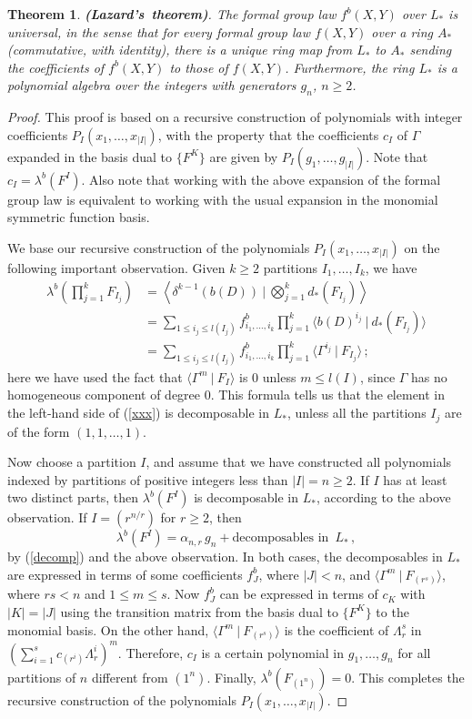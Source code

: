 \documentclass[a4paper,12pt]{amsart}
\newtheorem{thm}[equation]{Theorem}
\theoremstyle{definition}
\numberwithin{equation}{section}
\newcommand{\br}[1]{\langle#1\rangle}
\newcommand{\dual}[2]{\br{#1 \:|\: #2}}
\newcommand{\spa}{\;\:}
\begin{document}
\begin{thm}\mbox{\rm {\bf (Lazard's theorem)}}. 
The formal group law $f^b(X,Y)$ over $L_*$ is universal, in the sense that for every formal group law $f(X,Y)$ over a ring $A_*$ (commutative, with identity), there is a unique ring map from $L_*$ to $A_*$ sending the coefficients of $f^b(X,Y)$ to those of $f(X,Y)$. Furthermore, the ring $L_*$ is a polynomial algebra over the integers with generators $g_n$, $n\ge 2$.
\end{thm}
\begin{proof}
This proof is based on a recursive construction of polynomials with integer coefficients $P_I(x_1,\ldots,x_{|I|})$, with the property that the coefficients $c_I$ of $\varGamma$ expanded in the basis dual to $\{F^K\}$ are given by $P_I(g_1,\ldots,g_{|I|})$. Note that $c_I=\lambda^b(F^I)$. Also note that working with the above expansion of the formal group law is equivalent to working with the usual expansion in the monomial symmetric function basis. 

We base our recursive construction of the polynomials $P_I(x_1,\ldots,x_{|I|})$ on the following important observation. Given $k\ge 2$ partitions $I_1,\ldots,I_k$, we have
\begin{align}\label{xxx}
\lambda^b\left(\prod_{j=1}^k F_{I_j}\right)&=\left\langle\delta^{k-1}(b(D))\:|\:\bigotimes_{j=1}^k d_*(F_{I_j})\right\rangle\\
&=\sum_{1\le i_j\le l(I_j)}f_{i_1,\ldots,i_k}^b\prod_{j=1}^k\dual{b(D)^{i_j}}{d_*(F_{I_j})}\nonumber\\
&=\sum_{1\le i_j\le l(I_j)}f_{i_1,\ldots,i_k}^b\prod_{j=1}^k\dual{\varGamma^{i_j}}{F_{I_j}}\,;\nonumber
\end{align}
here we have used the fact that $\dual{\varGamma^m}{F_I}$ is $0$ unless $m\le l(I)$, since $\varGamma$ has no homogeneous component of degree $0$. This formula tells us that the element in the left-hand side of (\ref{xxx}) is decomposable in $L_*$, unless all the partitions $I_j$ are of the form $(1,1,\ldots,1)$.  

Now choose a partition $I$, and assume that we have constructed all polynomials indexed by partitions of positive integers less than $|I|=n\ge 2$. If $I$ has at least two distinct parts, then $\lambda^b(F^I)$ is decomposable in $L_*$, according to the above observation. If $I=(r^{n/r})$ for $r\ge 2$, then
\[\lambda^b(F^I)=\alpha_{n,r} \,g_n+\mbox{decomposables in}\spa L_*\,,\]
by (\ref{decomp}) and the above observation. In both cases, the decomposables in $L_*$ are expressed in terms of some coefficients $f_J^b$, where $|J|<n$, and $\dual{\varGamma^m}{F_{(r^s)}}$, where $rs<n$ and $1\le m\le s$. Now $f_J^b$ can be expressed in terms of $c_K$ with $|K|=|J|$ using the transition matrix from the basis dual to $\{F^K\}$ to the monomial basis. On the other hand, $\dual{\varGamma^m}{F_{(r^s)}}$ is the coefficient of $\varLambda_r^s$ in $\left(\sum_{i=1}^s c_{(r^i)}\varLambda_r^i\right)^m$. Therefore, $c_I$ is a certain polynomial in $g_1,\ldots,g_n$ for all partitions of $n$ different from $(1^n)$. Finally, $\lambda^b(F_{(1^n)})=0$. This completes the recursive construction of the polynomials $P_I(x_1,\ldots,x_{|I|})$.


\end{proof}
\end{document}
